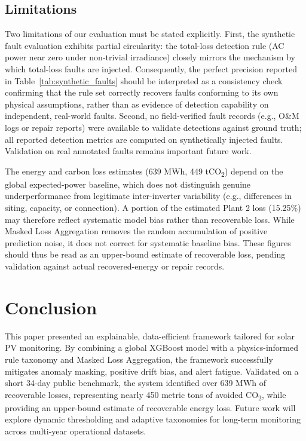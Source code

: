 \documentclass[11pt,a4paper,twoside]{article}
\begin{document}
\subsection{Limitations}
\label{sec:limitations}
Two limitations of our evaluation must be stated explicitly. First, the synthetic fault evaluation exhibits partial circularity: the total-loss detection rule (AC power near zero under non-trivial irradiance) closely mirrors the mechanism by which total-loss faults are injected. Consequently, the perfect precision reported in Table~\ref{tab:synthetic_faults} should be interpreted as a consistency check confirming that the rule set correctly recovers faults conforming to its own physical assumptions, rather than as evidence of detection capability on independent, real-world faults. Second, no field-verified fault records (e.g., O\&M logs or repair reports) were available to validate detections against ground truth; all reported detection metrics are computed on synthetically injected faults. Validation on real annotated faults remains important future work.

The energy and carbon loss estimates (639 MWh, 449 tCO\textsubscript{2}) depend on the global expected-power baseline, which does not distinguish genuine underperformance from legitimate inter-inverter variability (e.g., differences in siting, capacity, or connection). A portion of the estimated Plant 2 loss (15.25\%) may therefore reflect systematic model bias rather than recoverable loss. While Masked Loss Aggregation removes the random accumulation of positive prediction noise, it does not correct for systematic baseline bias. These figures should thus be read as an upper-bound estimate of recoverable loss, pending validation against actual recovered-energy or repair records.

\section{Conclusion}

This paper presented an explainable, data-efficient framework tailored for solar PV monitoring. By combining a global XGBoost model with a physics-informed rule taxonomy and Masked Loss Aggregation, the framework successfully mitigates anomaly masking, positive drift bias, and alert fatigue. Validated on a short 34-day public benchmark, the system identified over 639 MWh of recoverable losses, representing nearly 450 metric tons of avoided CO\textsubscript{2}, while providing an upper-bound estimate of recoverable energy loss. Future work will explore dynamic thresholding and adaptive taxonomies for long-term monitoring across multi-year operational datasets.
\end{document}
